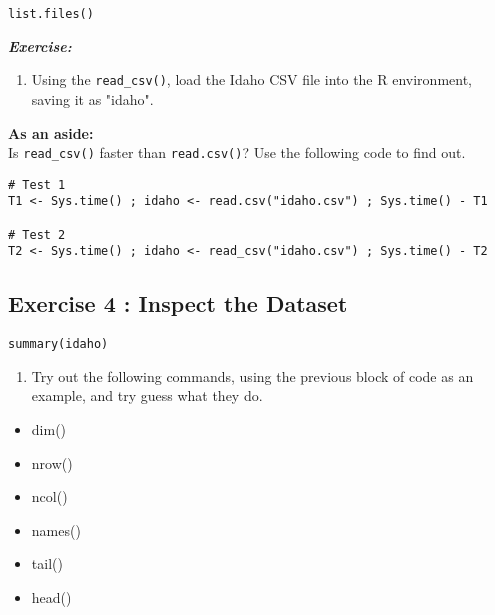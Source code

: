 \documentclass{article}
\begin{document}
\begin{framed}
\begin{verbatim}
list.files()
\end{verbatim}
\end{framed}


\noindent \textbf{\textit{Exercise:}}

\begin{enumerate}
\item Using the \texttt{read\_csv()}, load the Idaho CSV file into the R environment, saving it as "idaho".
\end{enumerate}



\smallskip
\textbf{As an aside:}\\

Is \texttt{read\_csv()} faster than \texttt{read.csv()}? Use the following code to find out.

\begin{framed}
\begin{verbatim}
# Test 1
T1 <- Sys.time() ; idaho <- read.csv("idaho.csv") ; Sys.time() - T1

# Test 2
T2 <- Sys.time() ; idaho <- read_csv("idaho.csv") ; Sys.time() - T2
\end{verbatim}
\end{framed}


\subsection*{Exercise 4 : Inspect the Dataset}

\begin{framed}
\begin{verbatim}
summary(idaho)
\end{verbatim}
\end{framed}

\begin{enumerate}
\item Try out the following commands, using the previous  block of code as an example, and try guess what they do.
\end{enumerate}

\begin{multicols}{3}
\begin{itemize}
\item dim()
\item nrow()
\item ncol()
\item names()
\item tail()
\item head()
\end{itemize}
\end{multicols}
\end{document}

